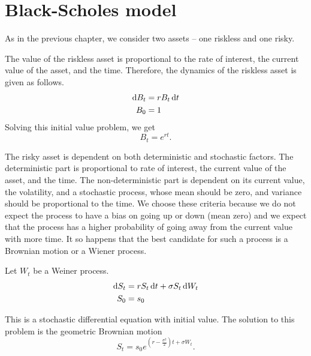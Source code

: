 
\section{Black-Scholes model}

As in the previous chapter, we consider two assets -- one riskless and one risky.

The value of the riskless asset is proportional to the rate of interest, the current value of the asset, and the time. Therefore, the dynamics of the riskless asset is given as follows.
\begin{align}
	\label{eq:continous-riskless-de}
	\dif B_t &= r B_t \dif t \\
	B_0 &= 1
\end{align}
Solving this initial value problem, we get
\begin{equation}
	\label{eq:continous-riskless-int}
	B_t = e^{rt}.
\end{equation}


The risky asset is dependent on both deterministic and stochastic factors. The deterministic part is proportional to rate of interest, the current value of the asset, and the time. The non-deterministic part is dependent on its current value, the volatility, and a stochastic process, whose mean should be zero, and variance should be proportional to the time. We choose these criteria because we do not expect the process to have a bias on going up or down (mean zero) and we expect that the process has a higher probability of going away from the current value with more time. It so happens that the best candidate for such a process is a Brownian motion or a Wiener process.

Let $ W_t $ be a Weiner process. 
\begin{align}
	\label{eq:continous-risky-sde}
	\dif S_t &= r S_t \dif t + \sigma S_t \dif W_t \\
	S_0 &= s_0
\end{align}

This is a stochastic differential equation with initial value. The solution to this problem is the geometric Brownian motion
\begin{equation}
	\label{eq:continous-risky-int}
	S_t = s_0 e^{ ( r - \frac{\sigma^2}{2} )t + \sigma W_t }.
\end{equation}


